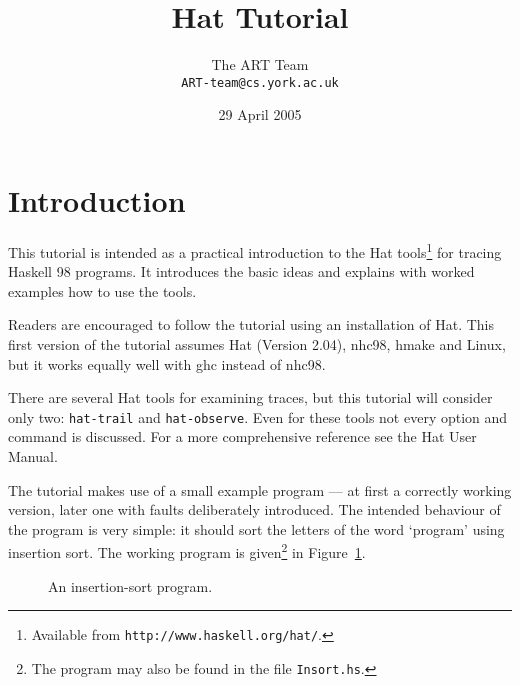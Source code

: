 \documentclass[12pt]{article}
\begin{document}
\title{Hat Tutorial}
\author{The ART Team \\
{\tt ART-team@cs.york.ac.uk}}
\date{29 April 2005}
\maketitle
\section{Introduction}

This tutorial is intended as a practical introduction to the
Hat tools\footnote{
Available from {\tt http://www.haskell.org/hat/}.}
for tracing Haskell 98 programs.
It introduces the basic ideas
and explains with worked examples how to use the tools.

Readers are encouraged to follow the
tutorial using an installation of Hat.
This first version of the tutorial assumes Hat (Version 2.04), nhc98, hmake
 and Linux, but it works equally
well with ghc instead of nhc98.

There are several Hat tools for examining traces, but this tutorial will
consider only two: {\tt hat-trail} and {\tt hat-observe}.
Even for these tools not every option and command is discussed.
For a more comprehensive reference see the Hat User Manual.

The tutorial makes use of a small example program ---
at first a correctly working version, later one with faults
deliberately introduced.
The intended behaviour of the program is very
simple: it should sort the letters of the word `program' using insertion sort.
The working program is given\footnote{
The program may also be found in the file {\tt Insort.hs}.}
in Figure~\ref{insort}.

\begin{figure}[t]
\caption{\label{insort}An insertion-sort program.}
\end{figure}
\end{document}
